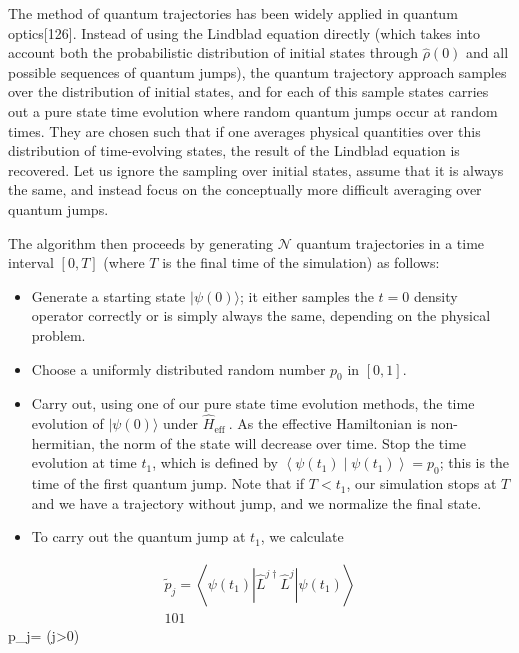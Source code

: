 \documentclass[12pt]{article}
\begin{document}
The method of quantum trajectories has been widely applied in quantum optics[126]. Instead of using the Lindblad equation directly (which takes into account both the probabilistic distribution of initial states through $\hat{\rho}(0)$ and all possible sequences of quantum jumps), the quantum trajectory approach samples over the distribution of initial states, and for each of this sample states carries out a pure state time evolution where random quantum jumps occur at random times. They are chosen such that if one averages physical quantities over this distribution of time-evolving states, the result of the Lindblad equation is recovered. Let us ignore the sampling over initial states, assume that it is always the same, and instead focus on the conceptually more difficult averaging over quantum jumps.

The algorithm then proceeds by generating $\mathcal{N}$ quantum trajectories in a time interval $[0, T]$ (where $T$ is the final time of the simulation) as follows:

\begin{itemize}
  \item Generate a starting state $|\psi(0)\rangle$; it either samples the $t=0$ density operator correctly or is simply always the same, depending on the physical problem.
  \item Choose a uniformly distributed random number $p_{0}$ in $[0,1]$.
  \item Carry out, using one of our pure state time evolution methods, the time evolution of $|\psi(0)\rangle$ under $\hat{H}_{\text {eff }}$. As the effective Hamiltonian is non-hermitian, the norm of the state will decrease over time. Stop the time evolution at time $t_{1}$, which is defined by $\left\langle\psi\left(t_{1}\right) \mid \psi\left(t_{1}\right)\right\rangle=p_{0}$; this is the time of the first quantum jump. Note that if $T<t_{1}$, our simulation stops at $T$ and we have a trajectory without jump, and we normalize the final state.
  \item To carry out the quantum jump at $t_{1}$, we calculate
\end{itemize}


\begin{gather*}
\tilde{p}_{j}=\left\langle\psi\left(t_{1}\right)\left|\hat{L}^{j \dagger} \hat{L}^{j}\right| \psi\left(t_{1}\right)\right\rangle  \tag{317}\\
101
\end{gather*} \quad p_{j}= \quad(j>0)
\end{document}
